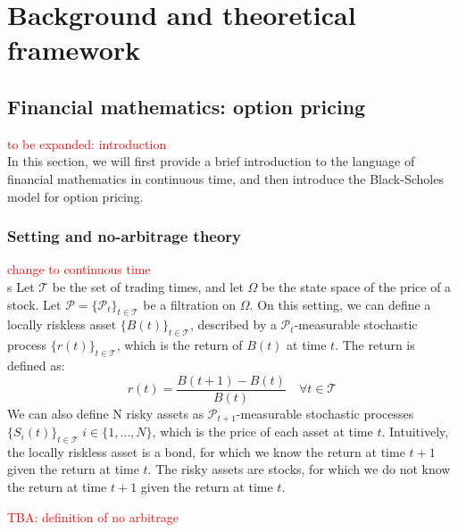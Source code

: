 \chapter{Background and theoretical framework}
\label{ch:background}

\section{Financial mathematics: option pricing}
\label{sec:financial_background}
\textcolor{red}{to be expanded: introduction}\\
In this section, we will first provide a brief introduction to the language of financial mathematics in continuous time, and then introduce the Black-Scholes model for option pricing.

\subsection{Setting and no-arbitrage theory}
\textcolor{red}{change to continuous time}\\s
Let $\mathcal{T}$ be the set of trading times, and let $\Omega$ be the state space of the price of a stock. Let $\mathcal{P} = \{\mathcal{P}_t\}_{t\in\mathcal{T}}$ be a filtration on $\Omega$. On this setting, we can define a locally riskless asset $\{B(t)\}_{t\in\mathcal{T}}$, described by a $\mathcal{P}_t$-measurable stochastic process $\{r(t)\}_{t\in\mathcal{T}}$, which is the return of $B(t)$ at time $t$. The return is defined as:
\begin{equation}
    r(t) = \frac{B(t+1)-B(t)}{B(t)} \quad \forall t\in\mathcal{T}
\end{equation}
We can also define N risky assets as $\mathcal{P}_{t+1}$-measurable stochastic processes $\{S_i(t)\}_{t\in\mathcal{T}} \; i\in \{1,\dots,N\}$, which is the price of each asset at time $t$. Intuitively, the locally riskless asset is a bond, for which we know the return at time $t+1$ given the return at time $t$. The risky assets are stocks, for which we do not know the return at time $t+1$ given the return at time $t$.



\textcolor{red}{TBA: definition of no arbitrage}

